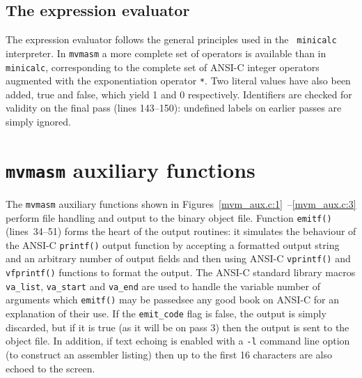 \subsection{The expression evaluator}

The expression evaluator follows the general principles used in the {\tt
minicalc}  interpreter. In {\tt mvmasm} a more complete set of operators
is available than in {\tt minicalc},
corresponding to the complete set of ANSI-C integer operators augmented
with the exponentiation operator {\tt **}. Two literal values have also been added,
{\sc true} and {\sc false}, which yield 1 and 0 respectively. Identifiers are checked
for validity on the final pass (lines 143--150): undefined labels on earlier passes are
simply ignored.

\section{{\tt mvmasm} auxiliary functions}

The {\tt mvmasm} auxiliary functions shown in
Figures~\ref{mvm_aux.c:1}~--\ref{mvm_aux.c:3} perform file handling and
output to the binary object file. Function \verb+emitf()+ 
(lines~34--51) forms the heart of the output routines: it simulates the
behaviour of  the ANSI-C {\tt printf()} output function by accepting a
formatted output string and an arbitrary number of output fields and
then using ANSI-C \verb+vprintf()+ and \verb+vfprintf()+ functions to
format the output. The ANSI-C standard library macros \verb|va_list|, \verb|va_start|
and \verb|va_end| are used to handle the variable number of arguments which \verb|emitf()|
may be passed\dash see any good book on ANSI-C for an explanation of their use.
If the \verb+emit_code+ flag is false, the output is
simply discarded, but if it is true (as it will be on pass 3) then the
output is sent to the  object file. In addition, if text echoing is
enabled with a {\tt -l} command line option (to construct an assembler
listing) then up to the first 16 characters are also echoed to the 
screen.

